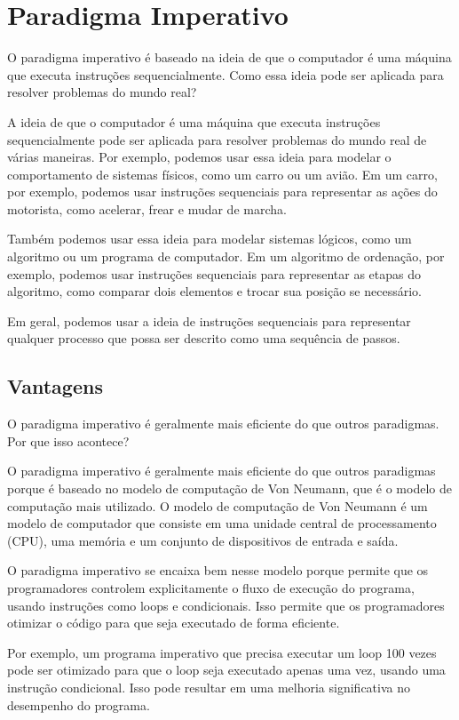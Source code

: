 \section{Paradigma Imperativo}
O paradigma imperativo é baseado na ideia de que o computador é uma máquina que executa instruções sequencialmente. Como essa ideia pode ser aplicada para resolver problemas do mundo real?

A ideia de que o computador é uma máquina que executa instruções sequencialmente pode ser aplicada para resolver problemas do mundo real de várias maneiras. Por exemplo, podemos usar essa ideia para modelar o comportamento de sistemas físicos, como um carro ou um avião. Em um carro, por exemplo, podemos usar instruções sequenciais para representar as ações do motorista, como acelerar, frear e mudar de marcha.

Também podemos usar essa ideia para modelar sistemas lógicos, como um algoritmo ou um programa de computador. Em um algoritmo de ordenação, por exemplo, podemos usar instruções sequenciais para representar as etapas do algoritmo, como comparar dois elementos e trocar sua posição se necessário.

Em geral, podemos usar a ideia de instruções sequenciais para representar qualquer processo que possa ser descrito como uma sequência de passos.

\subsection{Vantagens}
O paradigma imperativo é geralmente mais eficiente do que outros paradigmas. Por que isso acontece?

O paradigma imperativo é geralmente mais eficiente do que outros paradigmas porque é baseado no modelo de computação de Von Neumann, que é o modelo de computação mais utilizado. O modelo de computação de Von Neumann é um modelo de computador que consiste em uma unidade central de processamento (CPU), uma memória e um conjunto de dispositivos de entrada e saída.

O paradigma imperativo se encaixa bem nesse modelo porque permite que os programadores controlem explicitamente o fluxo de execução do programa, usando instruções como loops e condicionais. Isso permite que os programadores otimizar o código para que seja executado de forma eficiente.

Por exemplo, um programa imperativo que precisa executar um loop 100 vezes pode ser otimizado para que o loop seja executado apenas uma vez, usando uma instrução condicional. Isso pode resultar em uma melhoria significativa no desempenho do programa.

